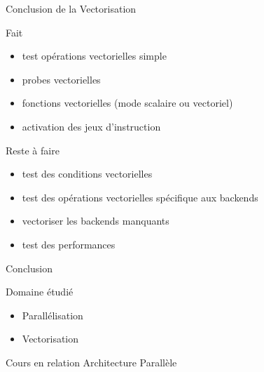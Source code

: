 \documentclass{beamer}
\begin{document}
\begin{frame}{Conclusion de la Vectorisation}

  \begin{block}{Fait}
    \begin{itemize}
    \item test opérations vectorielles simple
    \item probes vectorielles
    \item fonctions vectorielles (mode scalaire ou vectoriel)
    \item activation des jeux d'instruction
    \end{itemize}
  \end{block}

  \begin{alertblock}{Reste à faire}
    \begin{itemize}
    \item test des conditions vectorielles
    \item test des opérations vectorielles spécifique aux backends
    \item vectoriser les backends manquants
    \item test des performances
    \end{itemize}
  \end{alertblock}

\end{frame}

\begin{frame}{Conclusion}

  \begin{block}{Domaine étudié}
    \begin{itemize}
    \item Parallélisation
    \item Vectorisation
    \end{itemize}
  \end{block}
  
  \begin{block}{Cours en relation}
    Architecture Parallèle
  \end{block}

\end{frame}
\end{document}
